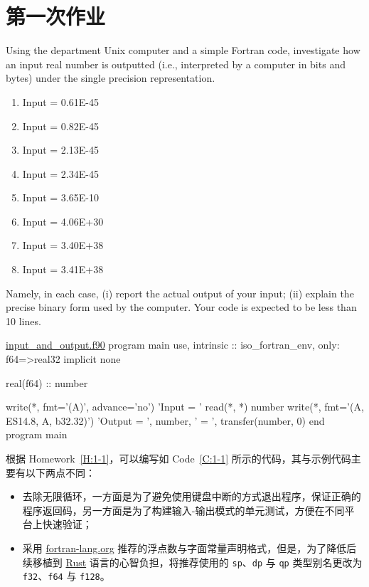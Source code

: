 \section{第一次作业}

\begin{homework}[label={H:1-1}]
    Using the department Unix computer and a simple Fortran code, investigate how an input real number is outputted (i.e., interpreted by a computer in bits and bytes) under the single precision representation.

    \begin{enumerate}[label=(\alph*)]
        \item Input = 0.61E-45
        \item Input = 0.82E-45
        \item Input = 2.13E-45
        \item Input = 2.34E-45
        \item Input = 3.65E-10
        \item Input = 4.06E+30
        \item Input = 3.40E+38
        \item Input = 3.41E+38
    \end{enumerate}

    Namely, in each case, (i) report the actual output of your input; (ii) explain the precise binary form used by the computer. Your code is expected to be less than 10 lines.
\end{homework}

\begin{fortran}[label={C:1-1}]{\href{https://github.com/iydon/CFDRust/blob/main/mae5005/code/1/input_and_output.f90}{input\_and\_output.f90}}
program main
   use, intrinsic :: iso_fortran_env, only: f64=>real32
   implicit none

   real(f64) :: number

   write(*, fmt='(A)', advance='no') 'Input  = '
   read(*, *) number
   write(*, fmt='(A, ES14.8, A, b32.32)') 'Output = ', number, ' = ', transfer(number, 0)
end program main
\end{fortran}

根据 Homework~\ref{H:1-1}，可以编写如 Code~\ref{C:1-1} 所示的代码，其与示例代码主要有以下两点不同：

\begin{itemize}
    \item 去除无限循环，一方面是为了避免使用键盘中断的方式退出程序，保证正确的程序返回码，另一方面是为了构建输入-输出模式的单元测试，方便在不同平台上快速验证；
    \item 采用 \href{https://fortran-lang.org/learn/quickstart/variables}{fortran-lang.org} 推荐的浮点数与字面常量声明格式，但是，为了降低后续移植到 \href{https://www.rust-lang.org}{Rust} 语言的心智负担，将推荐使用的 \verb|sp|、\verb|dp| 与 \verb|qp| 类型别名更改为 \verb|f32|、\verb|f64| 与 \verb|f128|。
\end{itemize}

